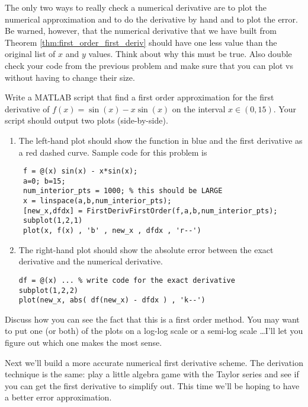 The only two ways to really check a numerical derivative are to plot the numerical
approximation and to do the derivative by hand and to plot the error. Be warned, however,
that the numerical derivative that we have built from Theorem
\ref{thm:first_order_first_deriv} should have one less value than the
original list of $x$ and $y$ values.  Think about why this must be true. Also double check
your code from the previous problem and make sure that you can plot  vs
 without having to change their size.  

\begin{problem}
    Write a MATLAB script that find a first order approximation for the first derivative
    of $f(x) = \sin(x) - x\sin(x)$ on the interval $x \in (0,15)$.  Your script should
    output two plots (side-by-side). 
    \begin{enumerate}
        \item The left-hand plot should show the function in blue and the first derivative
            as a red dashed curve. Sample code for this problem is
\begin{lstlisting}
 f = @(x) sin(x) - x*sin(x);
 a=0; b=15;
 num_interior_pts = 1000; % this should be LARGE
 x = linspace(a,b,num_interior_pts);
 [new_x,dfdx] = FirstDerivFirstOrder(f,a,b,num_interior_pts);
 subplot(1,2,1)
 plot(x, f(x) , 'b' , new_x , dfdx , 'r--')
\end{lstlisting}
        \item The right-hand plot should show the absolute error between the exact derivative and
            the numerical derivative.
\begin{lstlisting}
df = @(x) ... % write code for the exact derivative
subplot(1,2,2)
plot(new_x, abs( df(new_x) - dfdx ) , 'k--')
\end{lstlisting}
    \end{enumerate}
    Discuss how you can see the fact that this is a first order method.  You may want to
    put one (or both) of the plots on a log-log scale or a semi-log scale \ldots I'll let
    you figure out which one makes the most sense.
\end{problem}

Next we'll build a more accurate numerical first derivative scheme.  The derivation
technique is the same: play a little algebra game with the Taylor series and see if you
can get the first derivative to simplify out.  This time we'll be hoping to have a better
error approximation.

